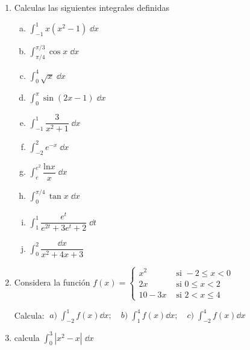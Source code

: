 \begin{enumerate}
\item Calculas las siguientes integrales definidas
\begin{multicols}{2}
\begin{enumerate}[a) ]
\item $\displaystyle \int_{-1}^{1} x(x^2-1) \; \dd x$
\item $\displaystyle \int_{\pi/4}^{\pi/3} \cos x \; \dd x$
\item $\displaystyle \int_{0}^{4} \sqrt{x} \; \dd x$
\item $\displaystyle \int_{0}^{\pi} \sin (2x-1) \; \dd x$
\item $\displaystyle \int_{-1}^{1} \dfrac {3}{x^2+1} \; \dd x$
\item $\displaystyle \int_{-2}^{2} e^{-x} \; \dd x$
\item $\displaystyle \int_{e}^{e^2} \dfrac {\mathrm{ln} x}{x} \; \dd x$
\item $\displaystyle \int_{0}^{\pi/4} \tan x \; \dd x$
\item  $\displaystyle \int_{1}^{1}  \dfrac {e^t}{e^{2t}+3e^t+2} \; \dd t$
\item $\displaystyle \int_0^2 \dfrac {\dd x}{x^2+4x+3}$
\end{enumerate}	
\end{multicols}




\item Considera la función $f(x)=\begin{cases}	
x^2 & \text{ si } -2\le x < 0 \\ 	
2x & \text{ si } 0\le x < 2 \\ 
10-3x & \text{ si } 2<x\le 4
\end{cases}$

Calcula: $\; a) \; \displaystyle \int_{-2}^1
f(x) \dd x ; \quad b) \; \int_1^4 f(x) \dd x ; \quad c)\; \int_{-2}^4 f(x) \dd x$

\rightline{\textcolor{gris}{Sol: $a)\; 11/3; \quad b) \; 5; \quad c) \; 26/3$}}

\item calcula $\displaystyle \int_0^3 |x^2-x|\; \dd x$

\rightline{\textcolor{gris}{Sol: $\; 29/6$ }}


\end{enumerate}
